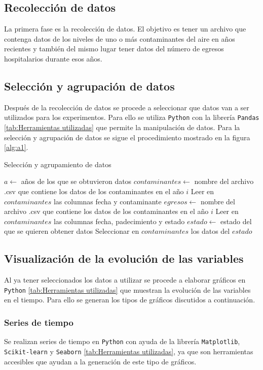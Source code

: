 \subsection{Recolección de datos}
La primera fase es la recolección de datos. El objetivo es tener un archivo que contenga datos de los niveles de uno o más contaminantes del aire en años recientes y también del mismo lugar tener datos del número de egresos hospitalarios durante esos años.

\subsection{Selección y agrupación de datos}
Después de la recolección de datos se procede a seleccionar que datos van a ser utilizados para los experimentos. Para ello se utiliza \texttt{Python} con la librería \texttt{Pandas} \ref{tab:Herramientas utilizadas} que permite la manipulación de datos. 
Para la selección y agrupación de datos se sigue el procedimiento mostrado en la figura \ref{alg:a1}.

\begin{algorithm}
\caption{Selección y agrupamiento de datos}\label{alg:a1}
\begin{algorithmic}[1]
\State $a \leftarrow $ años de los que se obtuvieron datos
    \State $contaminantes \leftarrow $ nombre del archivo .csv que contiene los datos de los contaminantes en el año $i$
    \State Leer en $contaminantes$ las columnas fecha y contaminante 
    \State $egresos \leftarrow $ nombre del archivo .csv que contiene los datos de los contaminantes en el año $i$
    \State Leer en $contaminantes$ las columnas fecha, padecimiento y estado
    \State $estado \leftarrow $ estado del que se quieren obtener datos
    \State Seleccionar en $contaminantes$ los datos del $estado$
\EndFor
\end{algorithmic} 
\end{algorithm}

\subsection{Visualización de la evolución de las variables}
Al ya tener seleccionados los datos a utilizar se procede a elaborar gráficos en \texttt{Python} \ref{tab:Herramientas utilizadas} que muestran la evolución de las variables en el tiempo. Para ello se generan los tipos de gráficos discutidos a continuación.

\subsubsection{Series de tiempo}
Se realizan series de tiempo en \texttt{Python} con ayuda de la librería  \texttt{Matplotlib}, \texttt{Scikit-learn} y \texttt{Seaborn} \ref{tab:Herramientas utilizadas}, ya que son herramientas accesibles que ayudan a la generación de este tipo de gráficos. %


